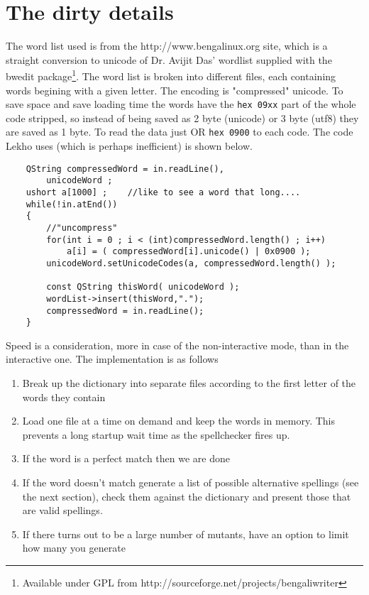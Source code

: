 \documentclass[11pt]{article}
\begin{document}
\section{The dirty details}

The word list used is from the http://www.bengalinux.org site, which is a straight conversion to unicode of Dr. Avijit Das' wordlist supplied with the bwedit package\footnote{Available under GPL from http://sourceforge.net/projects/bengaliwriter}. The word list is broken into different files, each containing words begining with a given letter. The encoding is "compressed" unicode. To save space and save loading time the words have the {\tt hex 09xx} part of the whole code stripped, so instead of being saved as 2 byte (unicode) or 3 byte (utf8) they are saved as 1 byte. To read the data just OR {\tt hex 0900} to each code. The code Lekho uses (which is perhaps inefficient) is shown below.
\begin{verbatim}
	QString compressedWord = in.readLine(),
		unicodeWord ;
	ushort a[1000] ;	//like to see a word that long....
	while(!in.atEnd())
	{
		//"uncompress"
		for(int i = 0 ; i < (int)compressedWord.length() ; i++)
			a[i] = ( compressedWord[i].unicode() | 0x0900 );
		unicodeWord.setUnicodeCodes(a, compressedWord.length() );

		const QString thisWord( unicodeWord );
		wordList->insert(thisWord,".");
		compressedWord = in.readLine();
	}
\end{verbatim}


Speed is a consideration, more in case of the non-interactive mode, than in the interactive one. The implementation is as follows

\begin{enumerate}
\item Break up the dictionary into separate files according to the first letter of the words they contain
\item Load one file at a time on demand and keep the words in memory. This prevents a long startup wait time as the spellchecker fires up.
\item If the word is a perfect match then we are done
\item If the word doesn't match generate a list of possible alternative spellings (see the next section), check them against the dictionary and present those that are valid spellings.
\item If there turns out to be  a large number of mutants, have an option to limit how many you generate
\end{enumerate}
\end{document}
